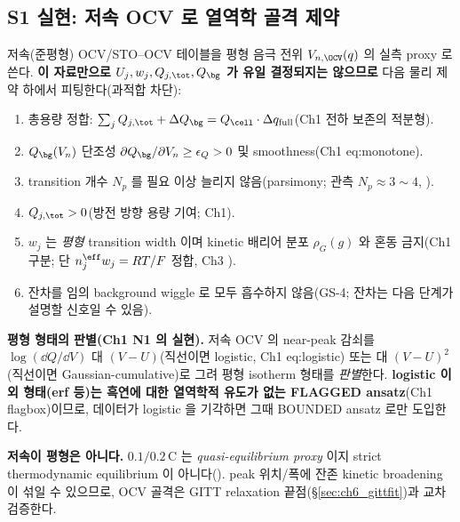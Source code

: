 \subsection{S1 실현: 저속 OCV 로 열역학 골격 제약}\label{sec:ch6_ocvfit}
저속(준평형) OCV/STO--OCV 테이블을 평형 음극 전위 $V_{n,\OCV}(q)$ 의 실측 proxy 로 쓴다. \textbf{이 자료만으로
$U_j,w_j,Q_{j,\tot},Q_\bg$ 가 유일 결정되지는 않으므로} 다음 물리 제약 하에서 피팅한다(과적합 차단):
\begin{enumerate}[label=O\arabic*),leftmargin=2.4em]
\item 총용량 정합: $\sum_j Q_{j,\tot}+\Delta Q_\bg=Q_\cell\cdot\Delta q_{\mathrm{full}}$(Ch1 전하 보존의 적분형).
\item $Q_\bg(V_n)$ 단조성 $\partial Q_\bg/\partial V_n\ge\epsilon_Q>0$ 및 smoothness(Ch1 eq:monotone).
\item transition 개수 $N_p$ 를 필요 이상 늘리지 않음(parsimony; 관측 $N_p\approx3\sim4$, ).
\item $Q_{j,\tot}>0$(방전 방향 용량 기여; Ch1).
\item $w_j$ 는 \emph{평형} transition width 이며 kinetic 배리어 분포 $\rho_G(g)$ 와 혼동 금지(Ch1 구분; 단
  $n_j^{\eff}w_j=RT/F$ 정합, Ch3 ).
\item 잔차를 임의 background wiggle 로 모두 흡수하지 않음(GS-4; 잔차는 다음 단계가 설명할 신호일 수 있음).
\end{enumerate}
\textbf{평형 형태의 판별(Ch1 N1 의 실현).} 저속 OCV 의 near-peak 감쇠를 $\log(\dd Q/\dd V)$ 대 $(V-U)$(직선이면
logistic, Ch1 eq:logistic) 또는 대 $(V-U)^2$(직선이면 Gaussian-cumulative)로 그려 평형 isotherm 형태를
\emph{판별}한다. \textbf{logistic 이외 형태(erf 등)는 흑연에 대한 열역학적 유도가 없는 FLAGGED ansatz}(Ch1
flagbox)이므로, 데이터가 logistic 을 기각하면 그때 BOUNDED ansatz 로만 도입한다.
\begin{boundbox}
\textbf{저속이 평형은 아니다.} $0.1/0.2\,\mathrm C$ 는 \emph{quasi-equilibrium proxy} 이지 strict thermodynamic
equilibrium 이 아니다(). peak 위치/폭에 잔존 kinetic broadening 이 섞일 수 있으므로, OCV 골격은 GITT
relaxation 끝점(\S\ref{sec:ch6_gittfit})과 교차 검증한다.
\end{boundbox}

